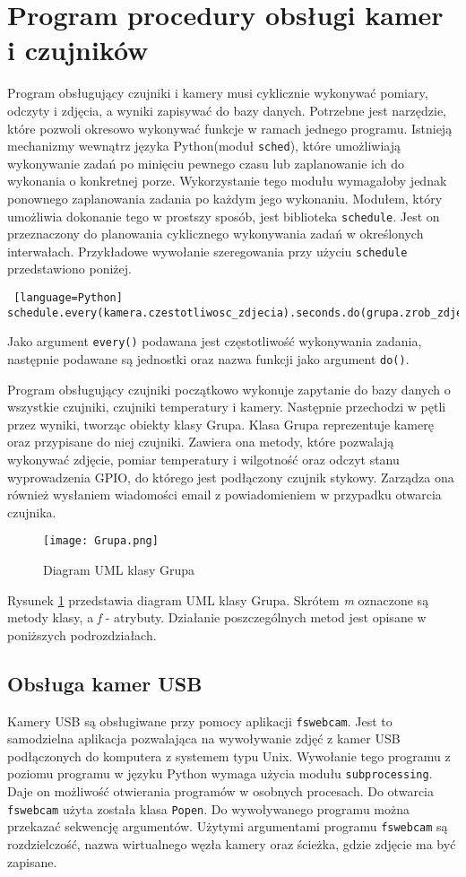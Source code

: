 \documentclass[a4paper,12pt,twoside]{article}
\begin{document}
\section{Program procedury obsługi kamer i czujników}
Program obsługujący czujniki i kamery musi cyklicznie wykonywać pomiary, odczyty i zdjęcia, a wyniki zapisywać do bazy danych. Potrzebne jest narzędzie, które pozwoli okresowo wykonywać funkcje w ramach jednego programu. Istnieją mechanizmy wewnątrz języka Python(moduł \texttt{sched}), które umożliwiają wykonywanie zadań po minięciu pewnego czasu lub zaplanowanie ich do wykonania o konkretnej porze. Wykorzystanie tego modułu wymagałoby jednak ponownego zaplanowania zadania po każdym jego wykonaniu. Modułem, który umożliwia dokonanie tego w prostszy sposób, jest biblioteka \texttt{schedule}. Jest on przeznaczony do planowania cyklicznego wykonywania zadań w określonych interwałach. Przykładowe wywołanie szeregowania przy użyciu \texttt{schedule} przedstawiono poniżej.
\begin{lstlisting} [language=Python]
schedule.every(kamera.czestotliwosc_zdjecia).seconds.do(grupa.zrob_zdjecie)
\end{lstlisting}
Jako argument \texttt{every()} podawana jest częstotliwość wykonywania zadania, następnie podawane są jednostki oraz nazwa funkcji jako argument \texttt{do()}.

Program obsługujący czujniki początkowo wykonuje zapytanie do bazy danych o wszystkie czujniki, czujniki temperatury i kamery. Następnie przechodzi w pętli przez wyniki, tworząc obiekty klasy Grupa. Klasa Grupa reprezentuje kamerę oraz przypisane do niej czujniki. Zawiera ona metody, które pozwalają wykonywać zdjęcie, pomiar temperatury i wilgotność oraz odczyt stanu wyprowadzenia GPIO, do którego jest podłączony czujnik stykowy. Zarządza ona również wysłaniem wiadomości email z powiadomieniem w przypadku otwarcia czujnika.
\begin{figure}[h]
\begin{center}
\texttt{[image: Grupa.png]}
\caption{Diagram UML klasy Grupa}
\label{fig: Grupa}
\end{center}
\end{figure}

Rysunek \ref{fig: Grupa} przedstawia diagram UML klasy Grupa. Skrótem \textit{m} oznaczone są metody klasy, a \textit{f} - atrybuty. Działanie poszczególnych metod jest opisane w poniższych podrozdziałach. 

\subsection{Obsługa kamer USB}
Kamery USB są obsługiwane przy pomocy aplikacji \texttt{fswebcam}. Jest to samodzielna aplikacja pozwalająca na wywoływanie zdjęć z kamer USB podłączonych do komputera z systemem typu Unix. Wywołanie tego programu z poziomu programu w języku Python wymaga użycia modułu \texttt{subprocessing}. Daje on możliwość otwierania programów w osobnych procesach. Do otwarcia \texttt{fswebcam} użyta została klasa \texttt{Popen}. Do wywoływanego programu można przekazać sekwencję argumentów. Użytymi argumentami programu \texttt{fswebcam} są rozdzielczość, nazwa wirtualnego węzła kamery oraz ścieżka, gdzie zdjęcie ma być zapisane.
\end{document}
